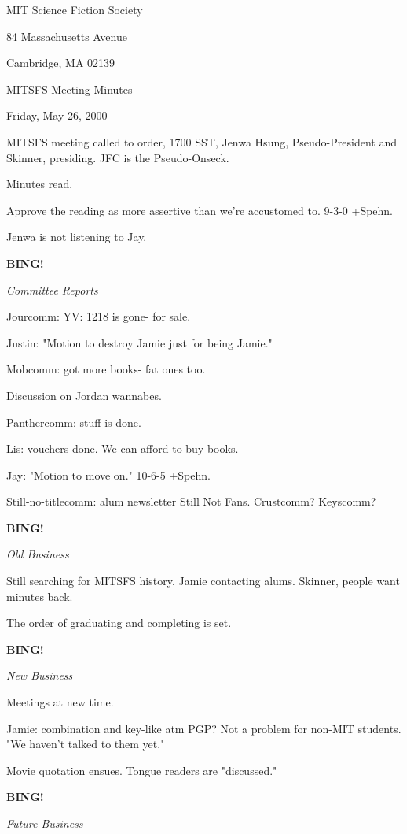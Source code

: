 \documentclass[12pt]{article}
\newcommand{\bing}{{\bf BING!} }
\newcommand{\goto}[1]{\bing \vskip 12pt \centerline{{\em{#1}}}}
\begin{document}
\begin{center}

MIT Science Fiction Society 

84 Massachusetts Avenue

Cambridge, MA 02139

\vspace{12pt}

MITSFS Meeting Minutes 

Friday, May 26, 2000

\end{center}
 
\vspace{18pt}

\setlength{\parskip}{6pt}

\noindent
MITSFS meeting called to order, 1700 SST, Jenwa Hsung, Pseudo-President and
Skinner, presiding.  JFC is the Pseudo-Onseck.

Minutes read.

Approve the reading as more assertive than we're accustomed to. 9-3-0 +Spehn.

Jenwa is not listening to Jay.

\goto{Committee Reports}

Jourcomm: YV: 1218 is gone- for sale.

Justin: "Motion to destroy Jamie just for being Jamie."

Mobcomm: got more books- fat ones too.

Discussion on Jordan wannabes.

Panthercomm: stuff is done.

Lis: vouchers done. We can afford to buy books.

Jay: "Motion to move on." 10-6-5 +Spehn.

Still-no-titlecomm: alum newsletter Still Not Fans. Crustcomm? Keyscomm?

\goto{Old Business}

Still searching for MITSFS history. Jamie contacting alums. Skinner, people want minutes back.

The order of graduating and completing is set.

\goto{New Business}

Meetings at new time.

Jamie: combination and key-like atm PGP? Not a problem for non-MIT students. "We haven't talked to them yet."

Movie quotation ensues. Tongue readers are "discussed."

\goto{Future Business}
\end{document}
